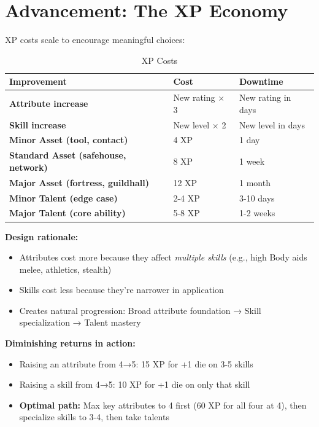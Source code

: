 \documentclass[11pt]{article}
\begin{document}
\section{Advancement: The XP Economy}

XP costs scale to encourage meaningful choices:

\begin{table}[h]
\centering
\caption{XP Costs}
\begin{tabular}{>{\bfseries}l l l}
\toprule
Improvement & Cost & Downtime \\
\midrule
Attribute increase & New rating $\times$ 3 & New rating in days \\
Skill increase & New level $\times$ 2 & New level in days \\
Minor Asset (tool, contact) & 4 XP & 1 day \\
Standard Asset (safehouse, network) & 8 XP & 1 week \\
Major Asset (fortress, guildhall) & 12 XP & 1 month \\
Minor Talent (edge case) & 2-4 XP & 3-10 days \\
Major Talent (core ability) & 5-8 XP & 1-2 weeks \\
\bottomrule
\end{tabular}
\end{table}

\textbf{Design rationale:}
\begin{itemize}
    \item Attributes cost more because they affect \textit{multiple skills} (e.g., high Body aids melee, athletics, stealth)
    \item Skills cost less because they're narrower in application
    \item Creates natural progression: Broad attribute foundation → Skill specialization → Talent mastery
\end{itemize}

\textbf{Diminishing returns in action:}
\begin{itemize}
    \item Raising an attribute from 4→5: 15 XP for +1 die on 3-5 skills
    \item Raising a skill from 4→5: 10 XP for +1 die on only that skill
    \item \textbf{Optimal path:} Max key attributes to 4 first (60 XP for all four at 4), then specialize skills to 3-4, then take talents
\end{itemize}
\end{document}

